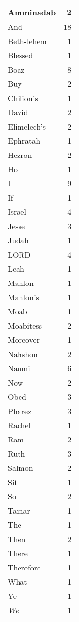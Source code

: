 \begin{center}
\begin{longtable}{l|r}
\hline \hline
\endlastfoot
Amminadab & 2 \\ \hline
And & 18 \\ \hline
Beth-lehem & 1 \\ \hline
Blessed & 1 \\ \hline
Boaz & 8 \\ \hline
Buy & 2 \\ \hline
Chilion's & 1 \\ \hline
David & 2 \\ \hline
Elimelech's & 2 \\ \hline
Ephratah & 1 \\ \hline
Hezron & 2 \\ \hline
Ho & 1 \\ \hline
I & 9 \\ \hline
If & 1 \\ \hline
Israel & 4 \\ \hline
Jesse & 3 \\ \hline
Judah & 1 \\ \hline
LORD & 4 \\ \hline
Leah & 1 \\ \hline
Mahlon & 1 \\ \hline
Mahlon's & 1 \\ \hline
Moab & 1 \\ \hline
Moabitess & 2 \\ \hline
Moreover & 1 \\ \hline
Nahshon & 2 \\ \hline
Naomi & 6 \\ \hline
Now & 2 \\ \hline
Obed & 3 \\ \hline
Pharez & 3 \\ \hline
Rachel & 1 \\ \hline
Ram & 2 \\ \hline
Ruth & 3 \\ \hline
Salmon & 2 \\ \hline
Sit & 1 \\ \hline
So & 2 \\ \hline
Tamar & 1 \\ \hline
The & 1 \\ \hline
Then & 2 \\ \hline
There & 1 \\ \hline
Therefore & 1 \\ \hline
What & 1 \\ \hline
Ye & 1 \\ \hline
\emph{We} & 1 \\ \hline

\end{longtable}
\end{center}
